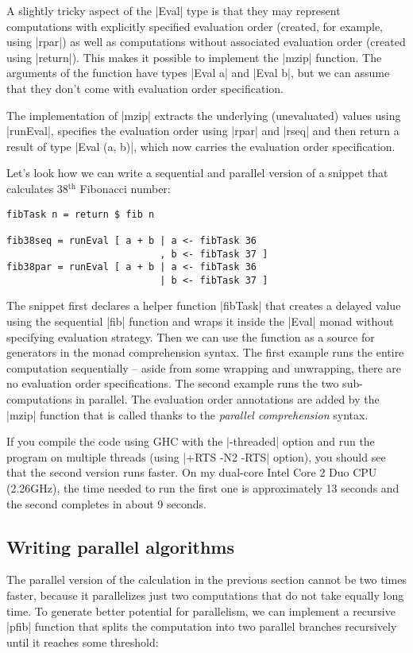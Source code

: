 \documentclass{tmr}
\begin{document}
A slightly tricky aspect of the |Eval| type is that they may represent computations with explicitly
specified evaluation order (created, for example, using |rpar|) as well as computations without 
associated evaluation order (created using |return|). This makes it possible to implement the 
|mzip| function. The arguments of the function have types |Eval a| and |Eval b|, but we can assume 
that they don't come with evaluation order specification. 

The implementation of |mzip| extracts the underlying (unevaluated) values using |runEval|, 
specifies the evaluation order using |rpar| and |rseq| and then return a result of type 
|Eval (a, b)|, which now carries the evaluation order specification. 

Let's look how we can write a sequential and parallel version of a snippet that calculates
38$^\text{th}$ Fibonacci number:

\begin{verbatim}
fibTask n = return $ fib n

fib38seq = runEval [ a + b | a <- fibTask 36
                           , b <- fibTask 37 ]
fib38par = runEval [ a + b | a <- fibTask 36
                           | b <- fibTask 37 ]
\end{verbatim}

The snippet first declares a helper function |fibTask| that creates a delayed value using 
the sequential |fib| function and wraps it inside the |Eval| monad without specifying evaluation
strategy. Then we can use the function as a source for generators in the monad comprehension
syntax. The first example runs the entire computation sequentially -- aside from some wrapping
and unwrapping, there are no evaluation order specifications. The second example runs the 
two sub-computations in parallel. The evaluation order annotations are added by the |mzip| 
function that is called thanks to the \textit{parallel comprehension} syntax.

If you compile the code using GHC with the |-threaded| option and run the program on multiple 
threads (using |+RTS -N2 -RTS| option), you should see that the second version runs faster. On my 
dual-core Intel Core 2 Duo CPU (2.26GHz), the time needed to run the first one is approximately
13 seconds and the second completes in about 9 seconds. 

\subsection{Writing parallel algorithms}
The parallel version of the calculation in the previous section cannot be two times faster, because 
it parallelizes just two computations that do not take equally long time. To generate better 
potential for parallelism, we can implement a recursive |pfib| function that splits the computation 
into two parallel branches recursively until it reaches some threshold:
\end{document}
